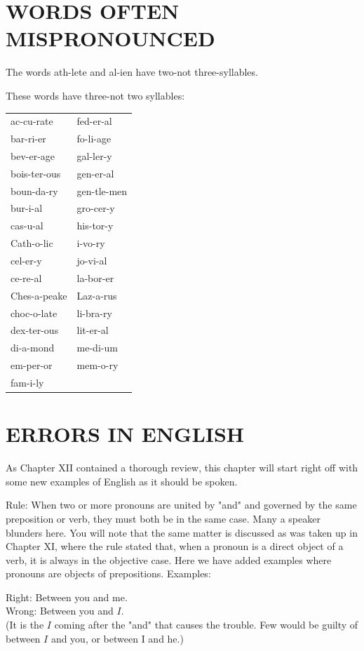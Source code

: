 \documentclass[10pt]{article}
\begin{document}
\section*{WORDS OFTEN MISPRONOUNCED}
The words ath-lete and al-ien have two-not three-syllables.

These words have three-not two syllables:

\begin{center}
\begin{tabular}{ll}
ac-cu-rate & fed-er-al \\
bar-ri-er & fo-li-age \\
bev-er-age & gal-ler-y \\
bois-ter-ous & gen-er-al \\
boun-da-ry & gen-tle-men \\
bur-i-al & gro-cer-y \\
cas-u-al & his-tor-y \\
Cath-o-lic & i-vo-ry \\
cel-er-y & jo-vi-al \\
ce-re-al & la-bor-er \\
Ches-a-peake & Laz-a-rus \\
choc-o-late & li-bra-ry \\
dex-ter-ous & lit-er-al \\
di-a-mond & me-di-um \\
em-per-or & mem-o-ry \\
fam-i-ly &  \\
\end{tabular}
\end{center}

\section*{ERRORS IN ENGLISH}
As Chapter XII contained a thorough review, this chapter will start right off with some new examples of English as it should be spoken.

Rule: When two or more pronouns are united by "and" and governed by the same preposition or verb, they must both be in the same case. Many a speaker blunders here. You will note that the same matter is discussed as was taken up in Chapter XI, where the rule stated that, when a pronoun is a direct object of a verb, it is always in the objective case. Here we have added examples where pronouns are objects of prepositions. Examples:

Right: Between you and me.\\
Wrong: Between you and $I$.\\
(It is the $I$ coming after the "and" that causes the trouble. Few would be guilty of between $I$ and you, or between I and he.)
\end{document}

